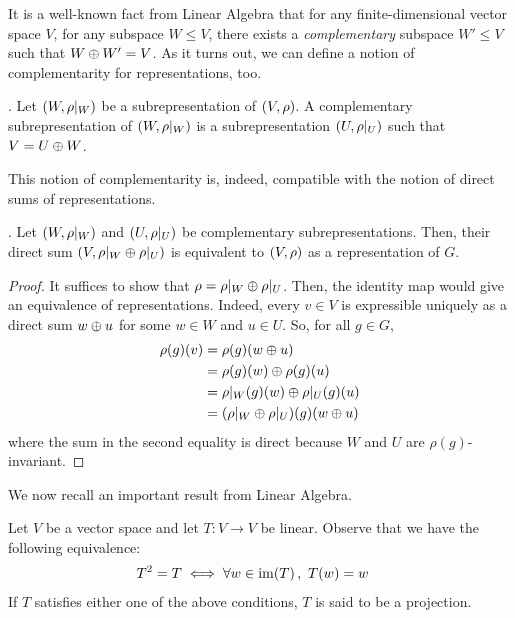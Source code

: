 It is a well-known fact from Linear Algebra that for any finite-dimensional vector space $V$, for any subspace $W \leq V$, there exists a \textit{complementary} subspace $W' \leq V$ such that $W \oplus W' = V$. As it turns out, we can define a notion of complementarity for representations, too.
\begin{boxdefinition}
    . Let $\left( W, \rho\vert_W \right)$ be a subrepresentation of $\left( V, \rho \right)$. A complementary subrepresentation of $\left( W, \rho\vert_W \right)$ is a subrepresentation $\left( U, \rho\vert_U \right)$ such that $V = U \oplus W$.
\end{boxdefinition}
This notion of complementarity is, indeed, compatible with the notion of direct sums of representations.
\begin{proposition}
    . Let $\left( W, \rho\vert_W \right)$ and $\left( U, \rho\vert_U \right)$ be complementary subrepresentations. Then, their direct sum $\left( V, \rho\vert_W \oplus \rho\vert_U \right)$ is equivalent to $\left( V, \rho \right)$ as a representation of $G$.
\end{proposition}
\begin{proof}
    It suffices to show that $\rho = \rho\vert_W \oplus \rho\vert_U$. Then, the identity map would give an equivalence of representations. Indeed, every $v \in V$ is expressible uniquely as a direct sum $w \oplus u$ for some $w \in W$ and $u \in U$. So, for all $g \in G$,
    \begin{align*}
        \rho(g)(v) &= \rho(g)(w \oplus u) \\
        &= \rho(g)(w) \oplus \rho(g)(u) \\
        &= \rho\vert_W(g)(w) \oplus \rho\vert_U(g)(u) \\
        &= \left( \rho\vert_W \oplus \rho\vert_U \right)\!(g)(w \oplus u)
    \end{align*}
    where the sum in the second equality is direct because $W$ and $U$ are $\rho(g)$-invariant.
\end{proof}

We now recall an important result from Linear Algebra.

\begin{definition}[Projection]
    Let $V$ be a vector space and let $T : V \to V$ be linear. Observe that we have the following equivalence:
    \begin{align}
        T^2 = T &\iff \forall w \in \operatorname{im}\!\left( T \right),\ T(w) = w \label{Ch1:Eq:Proj_Op_Equiv}
    \end{align}
    If $T$ satisfies either one of the above conditions, $T$ is said to be a projection.
\end{definition}

